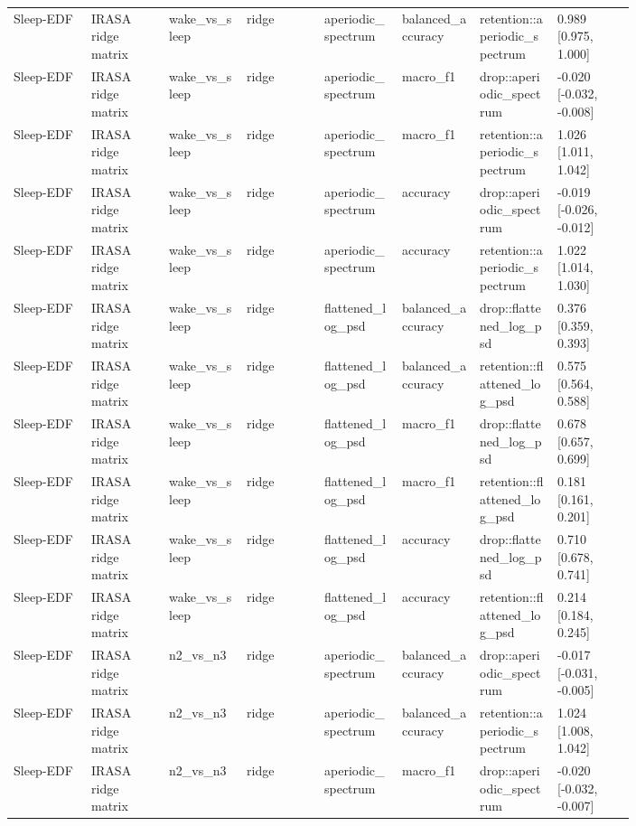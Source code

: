 \begin{longtable}{p{0.10\linewidth}p{0.10\linewidth}p{0.10\linewidth}p{0.10\linewidth}p{0.10\linewidth}p{0.10\linewidth}p{0.10\linewidth}p{0.10\linewidth}}
Sleep-EDF & IRASA ridge matrix & wake\_vs\_sleep & ridge & aperiodic\_spectrum & balanced\_accuracy & retention::aperiodic\_spectrum & 0.989 [0.975, 1.000]\\
Sleep-EDF & IRASA ridge matrix & wake\_vs\_sleep & ridge & aperiodic\_spectrum & macro\_f1 & drop::aperiodic\_spectrum & -0.020 [-0.032, -0.008]\\
Sleep-EDF & IRASA ridge matrix & wake\_vs\_sleep & ridge & aperiodic\_spectrum & macro\_f1 & retention::aperiodic\_spectrum & 1.026 [1.011, 1.042]\\
Sleep-EDF & IRASA ridge matrix & wake\_vs\_sleep & ridge & aperiodic\_spectrum & accuracy & drop::aperiodic\_spectrum & -0.019 [-0.026, -0.012]\\
Sleep-EDF & IRASA ridge matrix & wake\_vs\_sleep & ridge & aperiodic\_spectrum & accuracy & retention::aperiodic\_spectrum & 1.022 [1.014, 1.030]\\
Sleep-EDF & IRASA ridge matrix & wake\_vs\_sleep & ridge & flattened\_log\_psd & balanced\_accuracy & drop::flattened\_log\_psd & 0.376 [0.359, 0.393]\\
Sleep-EDF & IRASA ridge matrix & wake\_vs\_sleep & ridge & flattened\_log\_psd & balanced\_accuracy & retention::flattened\_log\_psd & 0.575 [0.564, 0.588]\\
Sleep-EDF & IRASA ridge matrix & wake\_vs\_sleep & ridge & flattened\_log\_psd & macro\_f1 & drop::flattened\_log\_psd & 0.678 [0.657, 0.699]\\
Sleep-EDF & IRASA ridge matrix & wake\_vs\_sleep & ridge & flattened\_log\_psd & macro\_f1 & retention::flattened\_log\_psd & 0.181 [0.161, 0.201]\\
Sleep-EDF & IRASA ridge matrix & wake\_vs\_sleep & ridge & flattened\_log\_psd & accuracy & drop::flattened\_log\_psd & 0.710 [0.678, 0.741]\\
Sleep-EDF & IRASA ridge matrix & wake\_vs\_sleep & ridge & flattened\_log\_psd & accuracy & retention::flattened\_log\_psd & 0.214 [0.184, 0.245]\\
Sleep-EDF & IRASA ridge matrix & n2\_vs\_n3 & ridge & aperiodic\_spectrum & balanced\_accuracy & drop::aperiodic\_spectrum & -0.017 [-0.031, -0.005]\\
Sleep-EDF & IRASA ridge matrix & n2\_vs\_n3 & ridge & aperiodic\_spectrum & balanced\_accuracy & retention::aperiodic\_spectrum & 1.024 [1.008, 1.042]\\
Sleep-EDF & IRASA ridge matrix & n2\_vs\_n3 & ridge & aperiodic\_spectrum & macro\_f1 & drop::aperiodic\_spectrum & -0.020 [-0.032, -0.007]\\

\end{longtable}
